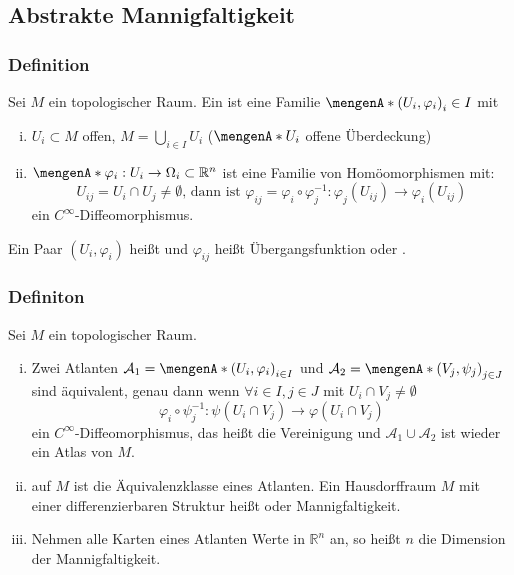 \subsection{Abstrakte Mannigfaltigkeit}
\label{sub:12}

\subsubsection[Definition: Karte und Atlas]{Definition}
\label{ssub:121}
Sei $M$ ein topologischer Raum. Ein  ist eine Familie $\set{(U_i,\varphi_i)}_i\in I$ mit
\begin{enumerate}[(i)]
	\item $U_i \subset M$ offen, $M = \bigcup_{i \in I} U_i$ ($\set{U_i}$ offene Überdeckung)
	\item $\set{\varphi_i:U_i \to \Omega_i \subset \mathds{R}^n}$ ist eine Familie von Homöomorphismen mit:
	\[
		U_{ij} = U_i \cap U_j \neq \emptyset \text{, dann ist } \varphi_{ij} = \varphi_i \circ \varphi_j^{-1}: \varphi_j(U_{ij}) \to \varphi_i(U_{ij})
	\]
	ein $C^{\infty}$-Diffeomorphismus.
\end{enumerate}
Ein Paar $(U_i,\varphi_i)$ heißt  und $\varphi_{ij}$ heißt Übergangsfunktion oder .

\subsubsection[Definition: Abstrakte differenzierbare Mannigfaltigkeit]{Definiton}
\label{ssub:122}
Sei $M$ ein topologischer Raum.
\begin{enumerate}[(i)]
	\item Zwei Atlanten $\mathcal{A}_1 = \set{(U_i,\varphi_i)}_{i\in I}$ und $\mathcal{A}_2 = \set{(V_j,\psi_j)}_{j\in J}$ sind äquivalent, genau dann wenn $\forall i\in I,j\in J$ mit $U_i\cap V_j\neq \emptyset$
	\[
		\varphi_i\circ \psi_j^{-1}:\psi(U_i\cap V_j) \to \varphi(U_i\cap V_j)
	\]
	ein $C^{\infty}$-Diffeomorphismus, das heißt die Vereinigung und $\mathcal{A}_1 \cup \mathcal{A}_2$ ist wieder ein Atlas von $M$.
	\item {} auf $M$ ist die Äquivalenzklasse eines Atlanten. Ein Hausdorffraum $M$ mit einer differenzierbaren Struktur heißt  oder Mannigfaltigkeit.
	\item Nehmen alle Karten eines Atlanten Werte in $\mathds{R}^n$ an, so heißt $n$ die Dimension der Mannigfaltigkeit.
\end{enumerate}

